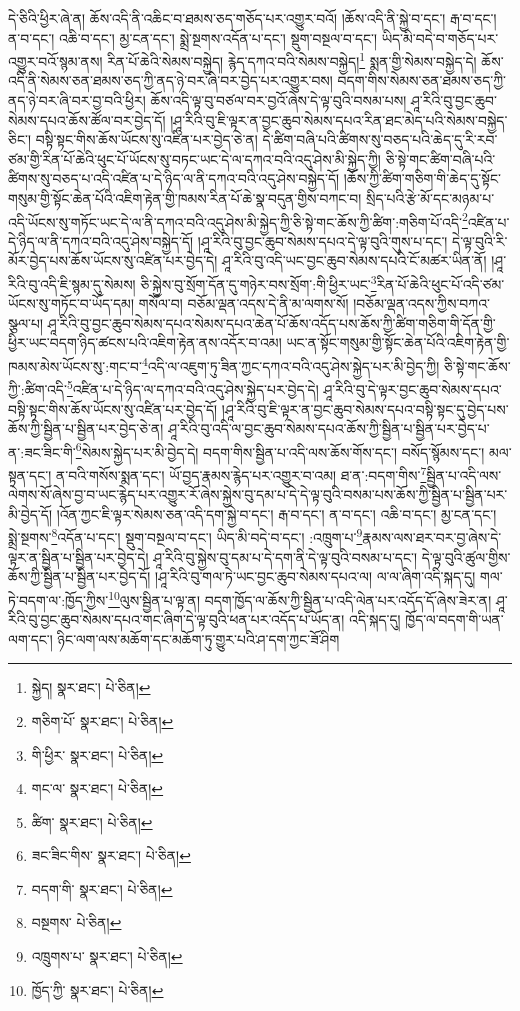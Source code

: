 དེ་ཅིའི་ཕྱིར་ཞེ་ན། ཆོས་འདི་ནི་འཆིང་བ་ཐམས་ཅད་གཅོད་པར་འགྱུར་བའོ། །ཆོས་འདི་ནི་སྐྱེ་བ་དང་། རྒ་བ་དང་། ན་བ་དང་། འཆི་བ་དང་། མྱ་ངན་དང་། སྨྲེ་སྔགས་འདོན་པ་དང་། སྡུག་བསྔལ་བ་དང་། ཡིད་མི་བདེ་བ་གཅོད་པར་འགྱུར་བའོ་སྙམ་ནས། རིན་པོ་ཆེའི་སེམས་བསྐྱེད། རྙེད་དཀའ་བའི་སེམས་བསྐྱེད།\footnote{སྐྱེད།  སྣར་ཐང་།  པེ་ཅིན། } སྨན་གྱི་སེམས་བསྐྱེད་དེ། ཆོས་འདི་ནི་སེམས་ཅན་ཐམས་ཅད་ཀྱི་ནད་ཉེ་བར་ཞི་བར་བྱེད་པར་འགྱུར་བས། བདག་གིས་སེམས་ཅན་ཐམས་ཅད་ཀྱི་ནད་ཉེ་བར་ཞི་བར་བྱ་བའི་ཕྱིར། ཆོས་འདི་ལྟ་བུ་བཙལ་བར་བྱའོ་ཞེས་དེ་ལྟ་བུའི་བསམ་པས། ཤཱ་རིའི་བུ་བྱང་ཆུབ་སེམས་དཔའ་ཆོས་ཚོལ་བར་བྱེད་དོ། །ཤཱ་རིའི་བུ་ཇི་ལྟར་ན་བྱང་ཆུབ་སེམས་དཔའ་རིན་ཐང་མེད་པའི་སེམས་བསྐྱེད་ཅིང་། བསྟི་སྟང་གིས་ཆོས་ཡོངས་སུ་འཛིན་པར་བྱེད་ཅེ་ན། དེ་ཚིག་བཞི་པའི་ཚིགས་སུ་བཅད་པའི་ཆེད་དུ་རི་རབ་ཙམ་གྱི་རིན་པོ་ཆེའི་ཕུང་པོ་ཡོངས་སུ་བཏང་ཡང་དེ་ལ་དཀའ་བའི་འདུ་ཤེས་མི་སྐྱེད་ཀྱི། ཅི་སྟེ་གང་ཚིག་བཞི་པའི་ཚིགས་སུ་བཅད་པ་འདི་འཛིན་པ་དེ་ཉིད་ལ་ནི་དཀའ་བའི་འདུ་ཤེས་བསྐྱེད་དོ། །ཆོས་ཀྱི་ཚིག་གཅིག་གི་ཆེད་དུ་སྟོང་གསུམ་གྱི་སྟོང་ཆེན་པོའི་འཇིག་རྟེན་གྱི་ཁམས་རིན་པོ་ཆེ་སྣ་བདུན་གྱིས་བཀང་བ། སྲིད་པའི་རྩེ་མོ་དང་མཉམ་པ་འདི་ཡོངས་སུ་གཏོང་ཡང་དེ་ལ་ནི་དཀའ་བའི་འདུ་ཤེས་མི་སྐྱེད་ཀྱི་ཅི་སྟེ་གང་ཆོས་ཀྱི་ཚིག་:གཅིག་པོ་འདི་\footnote{གཅིག་པོ་  སྣར་ཐང་།  པེ་ཅིན། }འཛིན་པ་དེ་ཉིད་ལ་ནི་དཀའ་བའི་འདུ་ཤེས་བསྐྱེད་དོ། །ཤཱ་རིའི་བུ་བྱང་ཆུབ་སེམས་དཔའ་དེ་ལྟ་བུའི་གུས་པ་དང་། དེ་ལྟ་བུའི་རི་མོར་བྱེད་པས་ཆོས་ཡོངས་སུ་འཛིན་པར་བྱེད་དེ། ཤཱ་རིའི་བུ་འདི་ཡང་བྱང་ཆུབ་སེམས་དཔའི་ངོ་མཚར་ཡིན་ནོ། །ཤཱ་རིའི་བུ་འདི་ཇི་སྙམ་དུ་སེམས། ཅི་སྐྱེས་བུ་སྲོག་དོན་དུ་གཉེར་བས་སྲོག་:གི་ཕྱིར་ཡང་\footnote{གི་ཕྱིར་  སྣར་ཐང་།  པེ་ཅིན། }རིན་པོ་ཆེའི་ཕུང་པོ་འདི་ཙམ་ཡོངས་སུ་གཏོང་བ་ཡོད་དམ། གསོལ་བ། བཅོམ་ལྡན་འདས་དེ་ནི་མ་ལགས་སོ། །བཅོམ་ལྡན་འདས་ཀྱིས་བཀའ་སྩལ་པ། ཤཱ་རིའི་བུ་བྱང་ཆུབ་སེམས་དཔའ་སེམས་དཔའ་ཆེན་པོ་ཆོས་འདོད་པས་ཆོས་ཀྱི་ཚིག་གཅིག་གི་དོན་གྱི་ཕྱིར་ཡང་བདག་ཉིད་ཚངས་པའི་འཇིག་རྟེན་ནས་འདོར་བ་འམ། ཡང་ན་སྟོང་གསུམ་གྱི་སྟོང་ཆེན་པོའི་འཇིག་རྟེན་གྱི་ཁམས་མེས་ཡོངས་སུ་:གང་བ་\footnote{གང་ལ་  སྣར་ཐང་།  པེ་ཅིན། }འདི་ལ་འཇུག་ཏུ་ཟིན་ཀྱང་དཀའ་བའི་འདུ་ཤེས་སྐྱེད་པར་མི་བྱེད་ཀྱི། ཅི་སྟེ་གང་ཆོས་ཀྱི་:ཚིག་འདི་\footnote{ཚིག་  སྣར་ཐང་།  པེ་ཅིན། }འཛིན་པ་དེ་ཉིད་ལ་དཀའ་བའི་འདུ་ཤེས་སྐྱེད་པར་བྱེད་དེ། ཤཱ་རིའི་བུ་དེ་ལྟར་བྱང་ཆུབ་སེམས་དཔའ་བསྟི་སྟང་གིས་ཆོས་ཡོངས་སུ་འཛིན་པར་བྱེད་དོ། །ཤཱ་རིའི་བུ་ཇི་ལྟར་ན་བྱང་ཆུབ་སེམས་དཔའ་བསྟི་སྟང་དུ་བྱེད་པས་ཆོས་ཀྱི་སྦྱིན་པ་སྦྱིན་པར་བྱེད་ཅེ་ན། ཤཱ་རིའི་བུ་འདི་ལ་བྱང་ཆུབ་སེམས་དཔའ་ཆོས་ཀྱི་སྦྱིན་པ་སྦྱིན་པར་བྱེད་པ་ན་:ཟང་ཟིང་གི་\footnote{ཟང་ཟིང་གིས་  སྣར་ཐང་།  པེ་ཅིན། }སེམས་སྐྱེད་པར་མི་བྱེད་དེ། བདག་གིས་སྦྱིན་པ་འདི་ལས་ཆོས་གོས་དང་། བསོད་སྙོམས་དང་། མལ་སྟན་དང་། ན་བའི་གསོས་སྨན་དང་། ཡོ་བྱད་རྣམས་རྙེད་པར་འགྱུར་བ་འམ། ཐ་ན་:བདག་གིས་\footnote{བདག་གི་  སྣར་ཐང་།  པེ་ཅིན། }སྦྱིན་པ་འདི་ལས་ལེགས་སོ་ཞེས་བྱ་བ་ཡང་རྙེད་པར་འགྱུར་རོ་ཞེས་སྐྱེས་བུ་དམ་པ་དེ་དེ་ལྟ་བུའི་བསམ་པས་ཆོས་ཀྱི་སྦྱིན་པ་སྦྱིན་པར་མི་བྱེད་དོ། །འོན་ཀྱང་ཇི་ལྟར་སེམས་ཅན་འདི་དག་སྐྱེ་བ་དང་། རྒ་བ་དང་། ན་བ་དང་། འཆི་བ་དང་། མྱ་ངན་དང་། སྨྲེ་སྔགས་\footnote{བསྔགས་  པེ་ཅིན། }འདོན་པ་དང་། སྡུག་བསྔལ་བ་དང་། ཡིད་མི་བདེ་བ་དང་། :འཁྲུག་པ་\footnote{འཁྲུགས་པ་  སྣར་ཐང་།  པེ་ཅིན། }རྣམས་ལས་ཐར་བར་བྱ་ཞེས་དེ་ལྟར་ན་སྦྱིན་པ་སྦྱིན་པར་བྱེད་དེ། ཤཱ་རིའི་བུ་སྐྱེས་བུ་དམ་པ་དེ་དག་ནི་དེ་ལྟ་བུའི་བསམ་པ་དང་། དེ་ལྟ་བུའི་ཚུལ་གྱིས་ཆོས་ཀྱི་སྦྱིན་པ་སྦྱིན་པར་བྱེད་དོ། །ཤཱ་རིའི་བུ་གལ་ཏེ་ཡང་བྱང་ཆུབ་སེམས་དཔའ་ལ། ལ་ལ་ཞིག་འདི་སྐད་དུ། གལ་ཏེ་བདག་ལ་:ཁྱོད་ཀྱིས་\footnote{ཁྱོད་ཀྱི་  སྣར་ཐང་།  པེ་ཅིན། }ལུས་སྦྱིན་པ་ལྟ་ན། བདག་ཁྱོད་ལ་ཆོས་ཀྱི་སྦྱིན་པ་འདི་ལེན་པར་འདོད་དོ་ཞེས་ཟེར་ན། ཤཱ་རིའི་བུ་བྱང་ཆུབ་སེམས་དཔའ་གང་ཞིག་དེ་ལྟ་བུའི་ཕན་པར་འདོད་པ་ཡོད་ན། འདི་སྐད་དུ། ཁྱོད་ལ་བདག་གི་ཡན་ལག་དང་། ཉིང་ལག་ལས་མཆོག་དང་མཆོག་ཏུ་གྱུར་པའི་ཤ་དག་ཀྱང་ཟོ་ཤིག 
